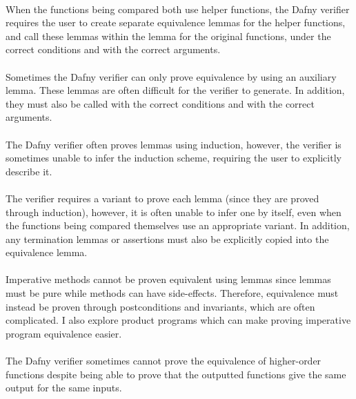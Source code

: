 \paragraph{} When the functions being compared both use helper functions, the Dafny verifier requires the user to create separate equivalence lemmas for the helper functions, and call these lemmas within the lemma for the original functions, under the correct conditions and with the correct arguments.
\paragraph{} Sometimes the Dafny verifier can only prove equivalence by using an auxiliary lemma. These lemmas are often difficult for the verifier to generate. In addition, they must also be called with the correct conditions and with the correct arguments.
\paragraph{} The Dafny verifier often proves lemmas using induction, however, the verifier is sometimes unable to infer the induction scheme, requiring the user to explicitly describe it.
\paragraph{} The verifier requires a variant to prove each lemma (since they are proved through induction), however, it is often unable to infer one by itself, even when the functions being compared themselves use an appropriate variant. In addition, any termination lemmas or assertions must also be explicitly copied into the equivalence lemma. 
\paragraph{} Imperative methods cannot be proven equivalent using lemmas since lemmas must be pure while methods can have side-effects. Therefore, equivalence must instead be proven through postconditions and invariants, which are often complicated. I also explore product programs\parencite{lahiriDifferentialAssertionChecking2013} which can make proving imperative program equivalence easier. 
\paragraph{} The Dafny verifier sometimes cannot prove the equivalence of higher-order functions despite being able to prove that the outputted functions give the same output for the same inputs.

